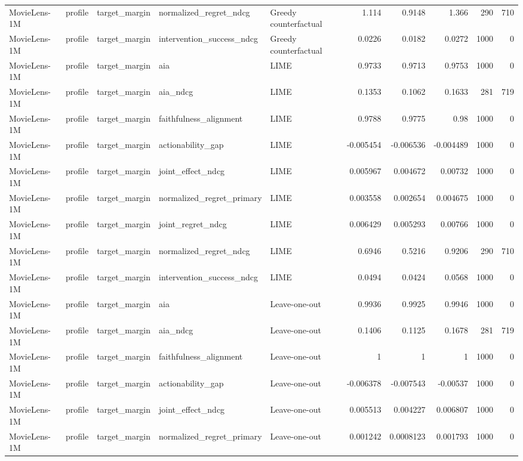 \begin{table}[t]
\begin{tabular}{lllllrrrrr}
MovieLens-1M & profile & target\_margin & normalized\_regret\_ndcg & Greedy counterfactual & 1.114 & 0.9148 & 1.366 & 290 & 710 \\
MovieLens-1M & profile & target\_margin & intervention\_success\_ndcg & Greedy counterfactual & 0.0226 & 0.0182 & 0.0272 & 1000 & 0 \\
MovieLens-1M & profile & target\_margin & aia & LIME & 0.9733 & 0.9713 & 0.9753 & 1000 & 0 \\
MovieLens-1M & profile & target\_margin & aia\_ndcg & LIME & 0.1353 & 0.1062 & 0.1633 & 281 & 719 \\
MovieLens-1M & profile & target\_margin & faithfulness\_alignment & LIME & 0.9788 & 0.9775 & 0.98 & 1000 & 0 \\
MovieLens-1M & profile & target\_margin & actionability\_gap & LIME & -0.005454 & -0.006536 & -0.004489 & 1000 & 0 \\
MovieLens-1M & profile & target\_margin & joint\_effect\_ndcg & LIME & 0.005967 & 0.004672 & 0.00732 & 1000 & 0 \\
MovieLens-1M & profile & target\_margin & normalized\_regret\_primary & LIME & 0.003558 & 0.002654 & 0.004675 & 1000 & 0 \\
MovieLens-1M & profile & target\_margin & joint\_regret\_ndcg & LIME & 0.006429 & 0.005293 & 0.00766 & 1000 & 0 \\
MovieLens-1M & profile & target\_margin & normalized\_regret\_ndcg & LIME & 0.6946 & 0.5216 & 0.9206 & 290 & 710 \\
MovieLens-1M & profile & target\_margin & intervention\_success\_ndcg & LIME & 0.0494 & 0.0424 & 0.0568 & 1000 & 0 \\
MovieLens-1M & profile & target\_margin & aia & Leave-one-out & 0.9936 & 0.9925 & 0.9946 & 1000 & 0 \\
MovieLens-1M & profile & target\_margin & aia\_ndcg & Leave-one-out & 0.1406 & 0.1125 & 0.1678 & 281 & 719 \\
MovieLens-1M & profile & target\_margin & faithfulness\_alignment & Leave-one-out & 1 & 1 & 1 & 1000 & 0 \\
MovieLens-1M & profile & target\_margin & actionability\_gap & Leave-one-out & -0.006378 & -0.007543 & -0.00537 & 1000 & 0 \\
MovieLens-1M & profile & target\_margin & joint\_effect\_ndcg & Leave-one-out & 0.005513 & 0.004227 & 0.006807 & 1000 & 0 \\
MovieLens-1M & profile & target\_margin & normalized\_regret\_primary & Leave-one-out & 0.001242 & 0.0008123 & 0.001793 & 1000 & 0 \\

\end{tabular}
\end{table}

